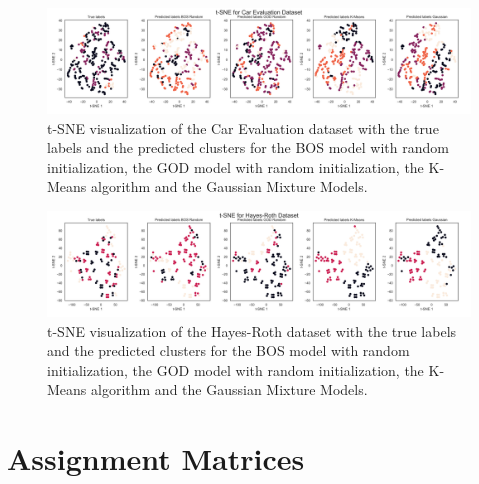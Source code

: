 \begin{figure}[H]
    \centering
    \includegraphics[width=\textwidth]{Attachments/tsne_car_evaluation.png}
    \caption{t-SNE visualization of the Car Evaluation dataset with the true labels and the predicted clusters for the BOS model with random initialization, the GOD model with random initialization, the K-Means algorithm and the Gaussian Mixture Models.}
    \label{fig:tsne_car}
\end{figure}

\begin{figure}[H]
    \centering
    \includegraphics[width=\textwidth]{Attachments/tsne_hayes-roth.png}
    \caption{t-SNE visualization of the Hayes-Roth dataset with the true labels and the predicted clusters for the BOS model with random initialization, the GOD model with random initialization, the K-Means algorithm and the Gaussian Mixture Models.}
    \label{fig:tsne_hr}
\end{figure}


\section{Assignment Matrices}
\label{sec:appendix_assign}

